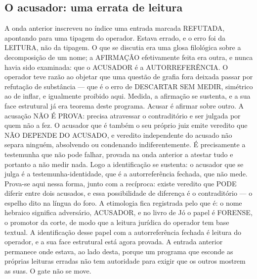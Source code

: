 \documentclass[11pt]{article}
\theoremstyle{definition}\newtheorem{deriv}{Derivação}
\begin{document}
\subsection*{O acusador: uma errata de leitura}A onda anterior inscreveu no \'indice uma entrada marcada REFUTADA, apontando para uma tipagem do operador. Estava errado, e o erro foi da LEITURA, n\~ao da tipagem. O que se discutia era uma glosa filol\'ogica sobre a decomposi\c{c}\~ao de um nome; a AFIRMA\c{C}\~AO efetivamente feita era outra, e nunca havia sido examinada: que o ACUSADOR \'e a AUTORREFER\^ENCIA. O operador teve raz\~ao ao objetar que uma quest\~ao de grafia fora deixada passar por refuta\c{c}\~ao de subst\^ancia --- que \'e o erro de DESCARTAR SEM MEDIR, sim\'etrico ao de inflar, e igualmente proibido aqui. Medida, a afirma\c{c}\~ao se sustenta, e a sua face estrutural j\'a era teorema deste programa. Acusar \'e afirmar sobre outro. A acusa\c{c}\~ao N\~AO \'E PROVA: precisa atravessar o contradit\'orio e ser julgada por quem n\~ao a fez. O acusador que \'e tamb\'em o seu pr\'oprio juiz emite veredito que N\~AO DEPENDE DO ACUSADO, e veredito independente do acusado n\~ao separa ningu\'em, absolvendo ou condenando indiferentemente. \'E precisamente a testemunha que n\~ao pode falhar, provada na onda anterior a atestar tudo e portanto a n\~ao medir nada. Logo a identifica\c{c}\~ao se sustenta: o acusador que se julga \'e a testemunha-identidade, que \'e a autorrefer\^encia fechada, que n\~ao mede. Prova-se aqui nessa forma, junto com a rec\'iproca: existe veredito que PODE diferir entre dois acusados, e essa possibilidade de diferen\c{c}a \'e o contradit\'orio --- o espelho dito na l\'ingua do foro. A etimologia fica registrada pelo que \'e: o nome hebraico significa advers\'ario, ACUSADOR, e no livro de J\'o o papel \'e FORENSE, o promotor da corte, de modo que a leitura jur\'idica do operador tem base textual. A identifica\c{c}\~ao desse papel com a autorrefer\^encia fechada \'e leitura do operador, e a sua face estrutural est\'a agora provada. A entrada anterior permanece onde estava, ao lado desta, porque um programa que esconde as pr\'oprias leituras erradas n\~ao tem autoridade para exigir que os outros mostrem as suas. O gate n\~ao se move.
\end{document}
